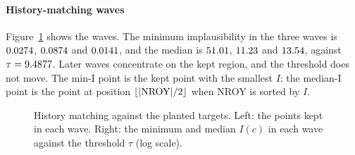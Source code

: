 \paragraph{History-matching waves} Figure~\ref{fig:waves} shows the waves. The
minimum implausibility in the three waves is $0.0274$, $0.0874$ and
$0.0141$, and the median is $51.01$, $11.23$ and
$13.54$, against $\tau=9.4877$. Later waves concentrate on the kept region,
and the threshold does not move. The min-I point is the kept point with the
smallest $I$; the median-I point is the point at position
$\lfloor|\mathrm{NROY}|/2\rfloor$ when NROY is sorted by $I$.

\begin{figure}[ht]
\centering
{}
\caption{History matching against the planted targets. Left: the points kept in
each wave. Right: the minimum and median $I(c)$ in each wave against the threshold
$\tau$ (log scale).}
\label{fig:waves}
\end{figure}

